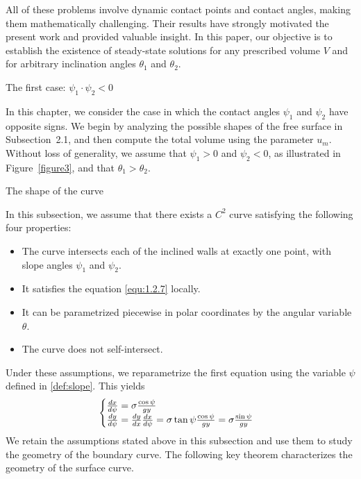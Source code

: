 \documentclass[letterpaper,reqno,10pt,twoside]{amsart}
\theoremstyle{definition}
\theoremstyle{remark}
\begin{document}
All of these problems involve dynamic contact points and contact angles, making them mathematically challenging. Their results have strongly motivated the present work and provided valuable insight. In this paper, our objective is to establish the existence of steady-state solutions for any prescribed volume $V$ and for arbitrary inclination angles $\theta_{1}$ and $\theta_{2}$.
    
    \begin{section}{The first case: $\psi_1\cdot \psi_2<0$ }
    
    In this chapter, we consider the case in which the contact angles $\psi_{1}$ and $\psi_{2}$ have opposite signs. We begin by analyzing the possible shapes of the free surface in Subsection~2.1, and then compute the total volume using the parameter $u_{m}$. Without loss of generality, we assume that $\psi_{1}>0$ and $\psi_{2}<0$, as illustrated in Figure~\ref{figure3}, and that $\theta_{1}>\theta_{2}$.
    
    \begin{subsection}{The shape of the curve}
    
    In this subsection, we assume that there exists a $C^{2}$ curve satisfying the following four properties:

    \begin{itemize}
    
    \item The curve intersects each of the inclined walls at exactly one point, with slope angles $\psi_{1}$ and $\psi_{2}$.
    
     \item It satisfies the equation \eqref{equ:1.2.7} locally. 
     
    \item It can be parametrized piecewise in polar coordinates by the angular variable $\theta$.

    \item The curve does not self-intersect.
    
    \end{itemize}
    
    Under these assumptions, we reparametrize the first equation using the variable $\psi$ defined in \eqref{def:slope}. This yields
    \begin{equation}{\label{equ:bdd_n}}
        \begin{cases}
        \frac{dx}{d\psi}=\sigma\frac{\cos\psi}{gy}\\
    \frac{dy}{d\psi}=\frac{dy}{dx}\frac{dx}{d\psi}=\sigma\tan\psi\frac{\cos\psi}{gy}=\sigma\frac{\sin\psi}{gy}\\
    \end{cases}
    \end{equation}
    \noindent We retain the assumptions stated above in this subsection and use them to study the geometry of the boundary curve. The following key theorem characterizes the geometry of the surface curve.


\end{subsection}
\end{section}
\end{document}
